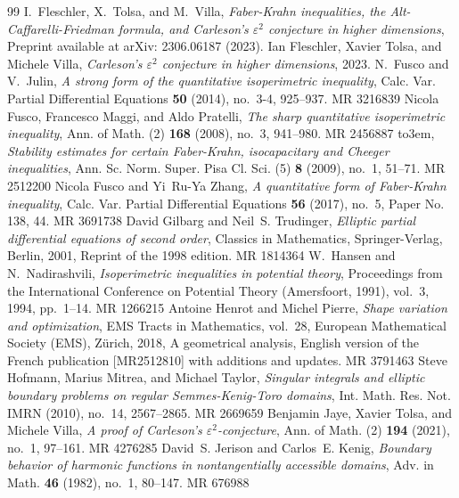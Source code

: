 \documentclass[10pt,a4paper]{amsart}
\numberwithin{equation}{section}
\providecommand{\bysame}{\leavevmode\hbox to3em{\hrulefill}\thinspace}
\providecommand{\MR}{\relax\ifhmode\unskip\space\fi MR }
\begin{document}
\begin{thebibliography}{99}
 I.~Fleschler, X.~Tolsa, and M.~Villa, \emph{Faber-{K}rahn inequalities, the {A}lt-{C}affarelli-{F}riedman formula, and {C}arleson's $\varepsilon^2$ conjecture in higher dimensions}, Preprint available at arXiv: 2306.06187 (2023).
 Ian Fleschler, Xavier Tolsa, and Michele Villa, \emph{Carleson's $\varepsilon^2$ conjecture in higher dimensions}, 2023.
 N.~Fusco and V.~Julin, \emph{A strong form of the quantitative isoperimetric inequality}, Calc. Var. Partial Differential Equations \textbf{50} (2014), no.~3-4, 925--937. \MR{3216839}
 Nicola Fusco, Francesco Maggi, and Aldo Pratelli, \emph{The sharp quantitative isoperimetric inequality}, Ann. of Math. (2) \textbf{168} (2008), no.~3, 941--980. \MR{2456887}
 \bysame, \emph{Stability estimates for certain {F}aber-{K}rahn, isocapacitary and {C}heeger inequalities}, Ann. Sc. Norm. Super. Pisa Cl. Sci. (5) \textbf{8} (2009), no.~1, 51--71. \MR{2512200}
 Nicola Fusco and Yi~Ru-Ya Zhang, \emph{A quantitative form of {F}aber-{K}rahn inequality}, Calc. Var. Partial Differential Equations \textbf{56} (2017), no.~5, Paper No. 138, 44. \MR{3691738}
 David Gilbarg and Neil~S. Trudinger, \emph{Elliptic partial differential equations of second order}, Classics in Mathematics, Springer-Verlag, Berlin, 2001, Reprint of the 1998 edition. \MR{1814364}
 W.~Hansen and N.~Nadirashvili, \emph{Isoperimetric inequalities in potential theory}, Proceedings from the {I}nternational {C}onference on {P}otential {T}heory ({A}mersfoort, 1991), vol.~3, 1994, pp.~1--14. \MR{1266215}
 Antoine Henrot and Michel Pierre, \emph{Shape variation and optimization}, EMS Tracts in Mathematics, vol.~28, European Mathematical Society (EMS), Z\"urich, 2018, A geometrical analysis, English version of the French publication [MR2512810] with additions and updates. \MR{3791463}
 Steve Hofmann, Marius Mitrea, and Michael Taylor, \emph{Singular integrals and elliptic boundary problems on regular {S}emmes-{K}enig-{T}oro domains}, Int. Math. Res. Not. IMRN (2010), no.~14, 2567--2865. \MR{2669659}
 Benjamin Jaye, Xavier Tolsa, and Michele Villa, \emph{A proof of {C}arleson's {$\varepsilon^2$}-conjecture}, Ann. of Math. (2) \textbf{194} (2021), no.~1, 97--161. \MR{4276285}
 David~S. Jerison and Carlos~E. Kenig, \emph{Boundary behavior of harmonic functions in nontangentially accessible domains}, Adv. in Math. \textbf{46} (1982), no.~1, 80--147. \MR{676988}

\end{thebibliography}
\end{document}
